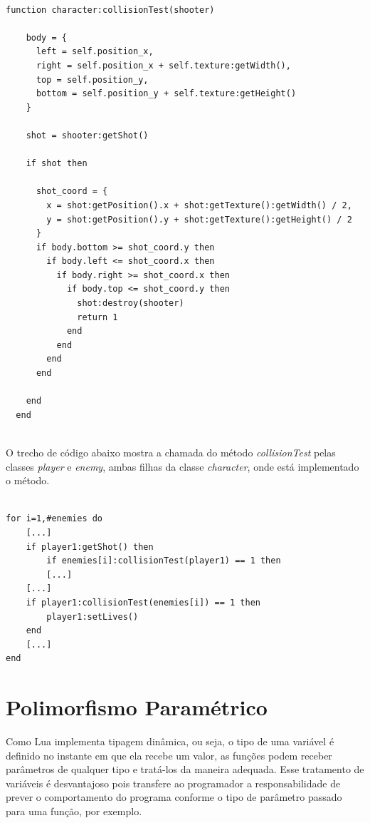 \documentclass[rel_mlp]{iiufrgs}
\begin{document}
\begin{lstlisting}

function character:collisionTest(shooter)

    body = {
      left = self.position_x,
      right = self.position_x + self.texture:getWidth(),
      top = self.position_y,
      bottom = self.position_y + self.texture:getHeight()
    }

    shot = shooter:getShot()

    if shot then

      shot_coord = {
        x = shot:getPosition().x + shot:getTexture():getWidth() / 2,
        y = shot:getPosition().y + shot:getTexture():getHeight() / 2
      }
      if body.bottom >= shot_coord.y then
        if body.left <= shot_coord.x then
          if body.right >= shot_coord.x then
            if body.top <= shot_coord.y then
              shot:destroy(shooter)
              return 1
            end
          end
        end
      end

    end
  end
  
\end{lstlisting}

\clearpage

O trecho de código abaixo mostra a chamada do método \textit{collisionTest} pelas classes \textit{player} e \textit{enemy}, ambas filhas da classe \textit{character}, onde está implementado o método.

\begin{lstlisting}

for i=1,#enemies do
    [...]
	if player1:getShot() then
    	if enemies[i]:collisionTest(player1) == 1 then
       	[...]
    [...]
    if player1:collisionTest(enemies[i]) == 1 then
    	player1:setLives()
    end
    [...]
end

\end{lstlisting}


\section{Polimorfismo Paramétrico}

Como Lua implementa tipagem dinâmica, ou seja, o tipo de uma variável é definido no instante em que ela recebe um valor, as funções podem receber parâmetros de qualquer tipo e tratá-los da maneira adequada. Esse tratamento de variáveis é desvantajoso pois transfere ao programador a responsabilidade de prever o comportamento do programa conforme o tipo de parâmetro passado para uma função, por exemplo. 
\end{document}
